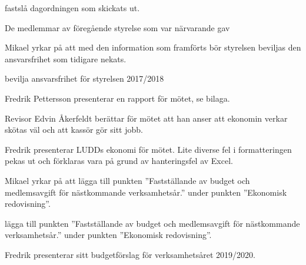 \documentclass{protokoll}
\begin{document}
\newpage  


\begin{beslut}
     \att fastslå dagordningen som skickats ut.
\end{beslut}

De medlemmar av föregående styrelse som var närvarande gav 

Mikael yrkar på att med den information som framförts bör styrelsen beviljas
den ansvarsfrihet som tidigare nekats. 

\begin{beslut}
  \att bevilja ansvarsfrihet för styrelsen 2017/2018
\end{beslut}

Fredrik Pettersson presenterar en rapport för mötet, se bilaga.

Revisor Edvin Åkerfeldt berättar för mötet att han anser att ekonomin verkar
skötas väl och att kassör gör sitt jobb. 

Fredrik presenterar LUDDs ekonomi för mötet. 
Lite diverse fel i formatteringen pekas ut och förklaras vara på grund av
hanteringsfel av Excel. 

Mikael yrkar på att lägga till punkten ''Fastställande av budget och medlemsavgift för nästkommande
verksamhetsår.'' under punkten ''Ekonomisk redovisning''. 
\begin{beslut}
\att lägga till punkten ''Fastställande av budget och medlemsavgift för nästkommande
verksamhetsår.'' under punkten ''Ekonomisk redovisning''.
\end{beslut}
Fredrik presenterar sitt budgetförslag för verksamhetsåret 2019/2020.
\end{document}
